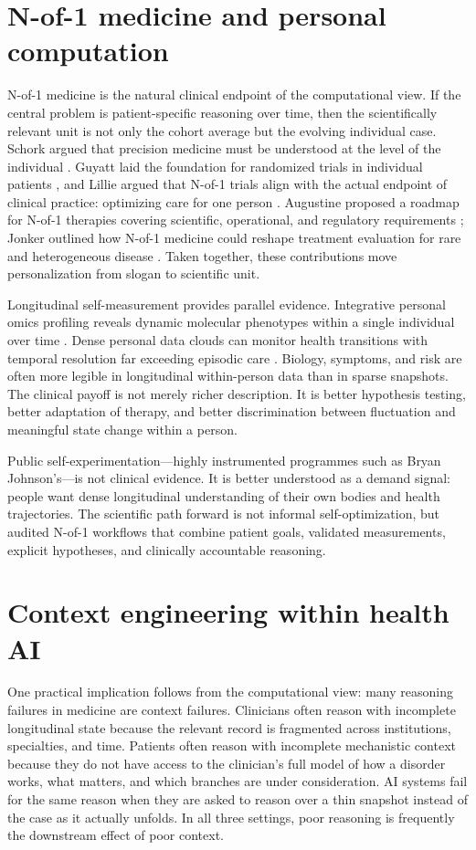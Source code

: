 \documentclass[11pt]{article}
\begin{document}
\section{N-of-1 medicine and personal computation}
N-of-1 medicine is the natural clinical endpoint of the computational view. If the central problem is patient-specific reasoning over time, then the scientifically relevant unit is not only the cohort average but the evolving individual case. Schork argued that precision medicine must be understood at the level of the individual \citep{schork2015}. Guyatt laid the foundation for randomized trials in individual patients \citep{guyatt1986}, and Lillie argued that N-of-1 trials align with the actual endpoint of clinical practice: optimizing care for one person \citep{lillie2011}. Augustine proposed a roadmap for N-of-1 therapies covering scientific, operational, and regulatory requirements \citep{augustine2024}; Jonker outlined how N-of-1 medicine could reshape treatment evaluation for rare and heterogeneous disease \citep{jonker2025}. Taken together, these contributions move personalization from slogan to scientific unit.

Longitudinal self-measurement provides parallel evidence. Integrative personal omics profiling reveals dynamic molecular phenotypes within a single individual over time \citep{chen2012}. Dense personal data clouds can monitor health transitions with temporal resolution far exceeding episodic care \citep{piening2018}. Biology, symptoms, and risk are often more legible in longitudinal within-person data than in sparse snapshots. The clinical payoff is not merely richer description. It is better hypothesis testing, better adaptation of therapy, and better discrimination between fluctuation and meaningful state change within a person.

Public self-experimentation---highly instrumented programmes such as Bryan Johnson's---is not clinical evidence. It is better understood as a demand signal: people want dense longitudinal understanding of their own bodies and health trajectories. The scientific path forward is not informal self-optimization, but audited N-of-1 workflows that combine patient goals, validated measurements, explicit hypotheses, and clinically accountable reasoning.

\section{Context engineering within health AI}
One practical implication follows from the computational view: many reasoning failures in medicine are context failures. Clinicians often reason with incomplete longitudinal state because the relevant record is fragmented across institutions, specialties, and time. Patients often reason with incomplete mechanistic context because they do not have access to the clinician's full model of how a disorder works, what matters, and which branches are under consideration. AI systems fail for the same reason when they are asked to reason over a thin snapshot instead of the case as it actually unfolds. In all three settings, poor reasoning is frequently the downstream effect of poor context.
\end{document}
